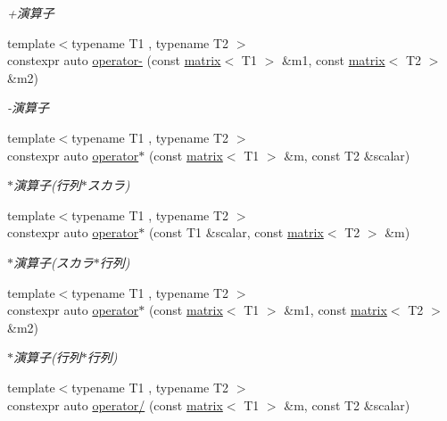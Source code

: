\begin{DoxyCompactItemize}
\begin{DoxyCompactList}\small\item\em +演算子 \end{DoxyCompactList}\item 
{\footnotesize template$<$typename T1 , typename T2 $>$ }\\constexpr auto \mbox{\hyperlink{namespacesaki_aa7474901f1f0d3a80142ed713b75ed5e}{operator-\/}} (const \mbox{\hyperlink{classsaki_1_1matrix}{matrix}}$<$ T1 $>$ \&m1, const \mbox{\hyperlink{classsaki_1_1matrix}{matrix}}$<$ T2 $>$ \&m2)
\begin{DoxyCompactList}\small\item\em -\/演算子 \end{DoxyCompactList}\item 
{\footnotesize template$<$typename T1 , typename T2 $>$ }\\constexpr auto \mbox{\hyperlink{namespacesaki_a8ec94b07795582554759e6f844b6055f}{operator$\ast$}} (const \mbox{\hyperlink{classsaki_1_1matrix}{matrix}}$<$ T1 $>$ \&m, const T2 \&scalar)
\begin{DoxyCompactList}\small\item\em $\ast$演算子(行列$\ast$スカラ) \end{DoxyCompactList}\item 
{\footnotesize template$<$typename T1 , typename T2 $>$ }\\constexpr auto \mbox{\hyperlink{namespacesaki_acc7d16324180fd378c3636f9bd961d20}{operator$\ast$}} (const T1 \&scalar, const \mbox{\hyperlink{classsaki_1_1matrix}{matrix}}$<$ T2 $>$ \&m)
\begin{DoxyCompactList}\small\item\em $\ast$演算子(スカラ$\ast$行列) \end{DoxyCompactList}\item 
{\footnotesize template$<$typename T1 , typename T2 $>$ }\\constexpr auto \mbox{\hyperlink{namespacesaki_ae7d9d53f473cbaa176e97500ea9ee491}{operator$\ast$}} (const \mbox{\hyperlink{classsaki_1_1matrix}{matrix}}$<$ T1 $>$ \&m1, const \mbox{\hyperlink{classsaki_1_1matrix}{matrix}}$<$ T2 $>$ \&m2)
\begin{DoxyCompactList}\small\item\em $\ast$演算子(行列$\ast$行列) \end{DoxyCompactList}\item 
{\footnotesize template$<$typename T1 , typename T2 $>$ }\\constexpr auto \mbox{\hyperlink{namespacesaki_ac69ad44a115a64e5874921344c34d62e}{operator/}} (const \mbox{\hyperlink{classsaki_1_1matrix}{matrix}}$<$ T1 $>$ \&m, const T2 \&scalar)

\end{DoxyCompactItemize}
